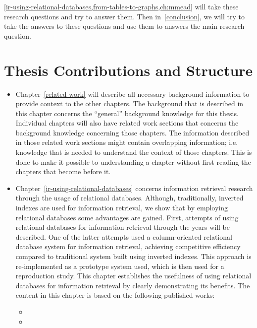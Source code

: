 \cref{ir-using-relational-databases,from-tables-to-graphs,ch:mmead} will take these research questions and try to answer them. Then in~\cref{conclusion}, we will try to take the answers to these questions and use them to answers the main research question. 

\section{Thesis Contributions and Structure}

\begin{itemize}
\item Chapter~\ref{related-work} will describe all necessary background information to provide context to the other chapters. The background that is described in this chapter concerns the ``general'' background knowledge for this thesis. Individual chapters will also have related work sections that concerns the background knowledge concerning those chapters. The information described in those related work sections might contain overlapping information; i.e. knowledge that is needed to understand the context of those chapters. This is done to make it possible to understanding a chapter without first reading the chapters that become before it. 

\item Chapter~\ref{ir-using-relational-databases} concerns information retrieval research through the usage of relational databases. 
Although, traditionally, inverted indexes are used for information retrieval, we show that by employing relational databases some advantages are gained. 
First, attempts of using relational databases for information retrieval through the years will be described. One of the latter attempts used a column-oriented relational database system for information retrieval, achieving competitive efficiency compared to traditional system built using inverted indexes. This approach is re-implemented as a prototype system used, which is then used for a reproduction study. This chapter establishes the usefulness of using relational databases for information retrieval by clearly demonstrating its benefits. The content in this chapter is based on the following published works: 

{
	\scriptsize
	\begin{itemize}
		\item {}
		\item {}
	\end{itemize}
}


\end{itemize}
